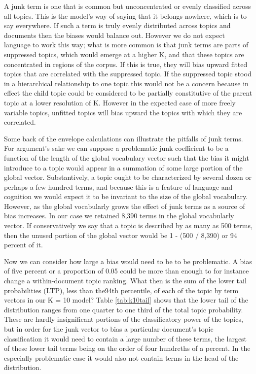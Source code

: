 \documentclass[]{book}
\theoremstyle{definition}
\theoremstyle{definition}
\theoremstyle{definition}
\theoremstyle{remark}
\begin{document}
A junk term is one that is common but unconcentrated or evenly
classified across all topics. This is the model's way of saying that it
belongs nowhere, which is to say everywhere. If such a term is truly
evenly distributed across topics and documents then the biases would
balance out. However we do not expect language to work this way; what is
more common is that junk terms are parts of suppressed topics, which
would emerge at a higher K, and that these topics are concentrated in
regions of the corpus. If this is true, they will bias upward fitted
topics that are correlated with the suppressed topic. If the suppressed
topic stood in a hierarchical relationship to one topic this would not
be a concern because in effect the child topic could be considered to be
partially constitutive of the parent topic at a lower resolution of K.
However in the expected case of more freely variable topics, unfitted
topics will bias upward the topics with which they are correlated.

Some back of the envelope calculations can illustrate the pitfalls of
junk terms. For argument's sake we can suppose a problematic junk
coefficient to be a function of the length of the global vocabulary
vector such that the bias it might introduce to a topic would appear in
a summation of some large portion of the global vector. Substantively, a
topic ought to be characterized by several dozen or perhaps a few
hundred terms, and because this is a feature of language and cognition
we would expect it to be invariant to the size of the global vocabulary.
However, as the global vocabularly grows the effect of junk terms as a
source of bias increases. In our case we retained 8,390 terms in the
global vocabularly vector. If conservatively we say that a topic is
described by as many as 500 terms, then the unused portion of the global
vector would be 1 - (500 / 8,390) or 94 percent of it.

Now we can consider how large a bias would need to be to be problematic.
A bias of five percent or a proportion of 0.05 could be more than enough
to for instance change a within-document topic ranking. What then is the
sum of the lower tail probabilities (LTP), less than the94th percentile,
of each of the topic by term vectors in our K = 10 model? Table
\ref{tab:k10tail} shows that the lower tail of the distribution ranges
from one quarter to one third of the total topic probability. These are
hardly insignificant portions of the classificatory power of the topics,
but in order for the junk vector to bias a particular document's topic
classification it would need to contain a large number of these terms,
the largest of these lower tail terms being on the order of four
hundreths of a percent. In the especially problematic case it would also
not contain terms in the head of the distribution.
\end{document}
